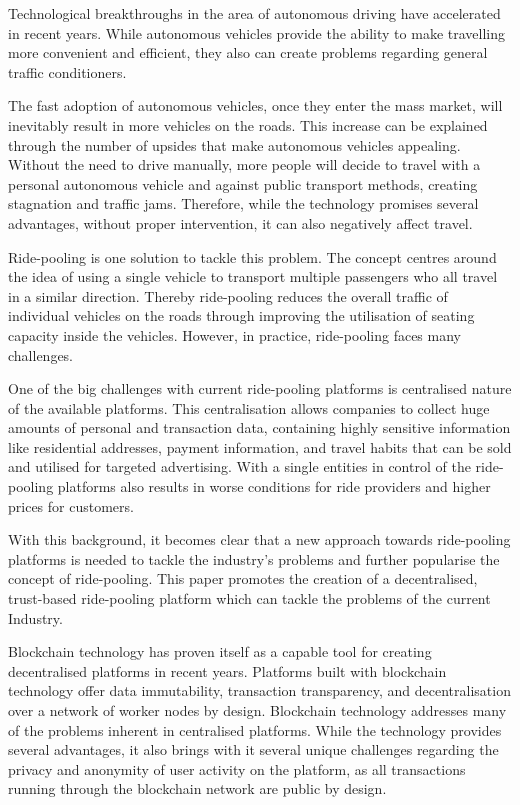 Technological breakthroughs in the area of autonomous driving have accelerated in recent years.
While autonomous vehicles provide the ability to make travelling more convenient and efficient, they also can create problems regarding general traffic conditioners.

The fast adoption of autonomous vehicles, once they enter the mass market, will inevitably result in more vehicles on the roads. This increase can be explained through the number of upsides that make autonomous vehicles appealing. Without the need to drive manually, more people will decide to travel with a personal autonomous vehicle and against public transport methods, creating stagnation and traffic jams. Therefore, while the technology promises several advantages, without proper intervention, it can also negatively affect  travel.

Ride-pooling is one solution to tackle this problem. The concept centres around the idea of using a single vehicle to transport multiple passengers who all travel in a similar direction. Thereby ride-pooling reduces the overall traffic of individual vehicles on the roads through improving the utilisation of seating capacity inside the vehicles. However, in practice, ride-pooling faces many challenges.

One of the big challenges with current ride-pooling platforms is centralised nature of the available platforms. This centralisation allows companies to collect huge amounts of personal and transaction data, containing highly sensitive information like residential addresses, payment information, and travel habits that can be sold and utilised for targeted advertising. With a single entities in control of the ride-pooling platforms also results in worse conditions for ride providers and higher prices for customers. 

With this background, it becomes clear that a new approach towards ride-pooling platforms is needed to tackle the industry's problems and further popularise the concept of ride-pooling. This paper promotes the creation of a decentralised, trust-based ride-pooling platform which can tackle the problems of the current Industry.

Blockchain technology has proven itself as a capable tool for creating decentralised platforms in recent years. Platforms built with blockchain technology offer  data immutability, transaction transparency, and decentralisation  over a network of worker nodes by design. Blockchain technology addresses many of the problems inherent in centralised platforms. While the technology provides several advantages, it also brings with it several unique challenges regarding the privacy and anonymity of user activity on the platform, as all transactions running through the blockchain network are public by design.

